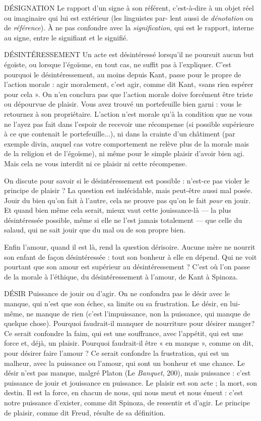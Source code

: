 DÉSIGNATION Le rapport d’un signe à son référent, c’est-à-dire à un objet
réel ou imaginaire qui lui est extérieur (les linguistes par-
lent aussi de {\it dénotation} ou de {\it référence}). À ne pas confondre avec la {\it signification},
qui est le rapport, interne au signe, entre le signifiant et le signifié.

DÉSINTÉRESSEMENT Un acte est désintéressé lorsqu'il ne poursuit aucun
but égoïste, ou lorsque l’égoïsme, en tout cas, ne
suffit pas à l’expliquer. C’est pourquoi le désintéressement, au moins depuis
Kant, passe pour le propre de l’action morale : agir moralement, c’est agir,
comme dit Kant, «sans rien espérer pour cela ». On n’en conclura pas que
l’action morale doive forcément être triste ou dépourvue de plaisir. Vous avez
trouvé un portefeuille bien garni : vous le retournez à son propriétaire. L'action
n'est morale qu’à la condition que ne vous ne l’ayez pas fait dans l'espoir de
recevoir une récompense (si possible supérieure à ce que contenait le portefeuille...),
ni dans la crainte d’un châtiment (par exemple divin, auquel cas
votre comportement ne relève plus de la morale mais de la religion et de
l’égoïsme), ni même pour le simple plaisir d’avoir bien agi. Mais cela ne vous
interdit ni ce plaisir ni cette récompense.

On discute pour savoir si le désintéressement est possible : n’est-ce pas
violer le principe de plaisir ? La question est indécidable, mais peut-être aussi
mal posée. Jouir du bien qu’on fait à l’autre, cela ne prouve pas qu’on le fait
{\it pour} en jouir. Et quand bien même cela serait, mieux vaut cette jouissance-là
— la plus désintéressée possible, même si elle ne l’est jamais totalement — que
celle du salaud, qui ne sait jouir que du mal ou de son propre bien.

Enfin l'amour, quand il est là, rend la question dérisoire. Aucune mère ne
nourrit son enfant de façon désintéressée : tout son bonheur à elle en dépend.
Qui ne voit pourtant que son amour est supérieur au désintéressement ? C’est
où l’on passe de la morale à l'éthique, du désintéressement à l’amour, de Kant
à Spinoza.

DÉSIR Puissance de jouir ou d’agir.
On ne confondra pas le désir avec le manque, qui n’est que son
échec, sa limite ou sa frustration. Le désir, en lui-même, ne manque de rien
(c’est l’impuissance, non la puissance, qui manque de quelque chose). Pourquoi
faudrait-il manquer de nourriture pour désirer manger? Ce serait
confondre la faim, qui est une souffrance, avec l'appétit, qui est une force et,
déjà, un plaisir. Pourquoi faudrait-il être « en manque », comme on dit, pour
désirer faire l'amour ? Ce serait confondre la frustration, qui est un malheur,
avec la puissance ou l’amour, qui sont un bonheur et une chance. Le désir n’est
pas manque, malgré Platon (Le {\it Banquet}, 200), mais puissance : c’est puissance
de jouir et jouissance en puissance. Le plaisir est son acte ; la mort, son destin.
Il est la force, en chacun de nous, qui nous meut et nous émeut : c’est notre
puissance d'exister, comme dit Spinoza, de ressentir et d’agir. Le principe de
plaisir, comme dit Freud, résulte de sa définition.

